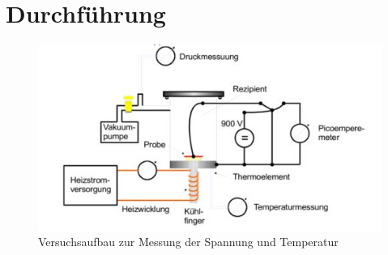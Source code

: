\section{Durchführung}
\label{sec:Durchführung}
\begin{figure}
  \includegraphics{./plots/Aufbau.JPG}
  \caption{Versuchsaufbau zur Messung der Spannung und Temperatur}
  \label{fig:aufbau}
\end{figure}
